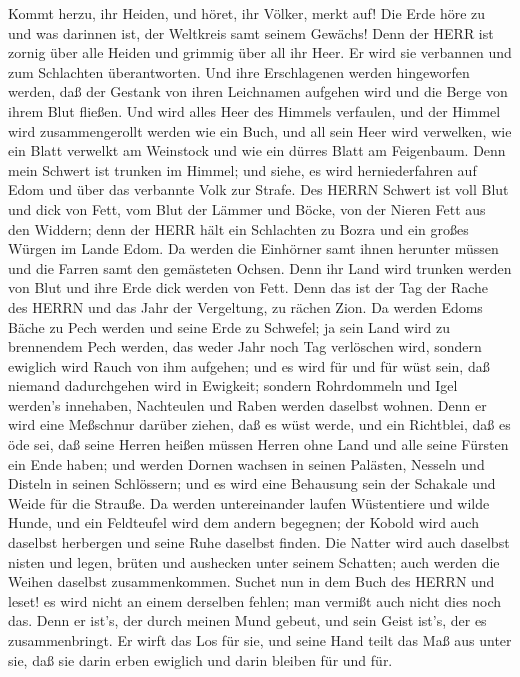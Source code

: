  Kommt herzu, ihr Heiden, und höret, ihr Völker, merkt auf!
Die Erde höre zu und was darinnen ist, der Weltkreis samt seinem
Gewächs!  Denn der HERR ist zornig über alle Heiden und
grimmig über all ihr Heer. Er wird sie verbannen und zum Schlachten
überantworten.  Und ihre Erschlagenen werden hingeworfen
werden, daß der Gestank von ihren Leichnamen aufgehen wird und die Berge
von ihrem Blut fließen.  Und wird alles Heer des Himmels
verfaulen, und der Himmel wird zusammengerollt werden wie ein Buch, und
all sein Heer wird verwelken, wie ein Blatt verwelkt am Weinstock und
wie ein dürres Blatt am Feigenbaum.  Denn mein Schwert ist
trunken im Himmel; und siehe, es wird herniederfahren auf Edom und über
das verbannte Volk zur Strafe.  Des HERRN Schwert ist voll
Blut und dick von Fett, vom Blut der Lämmer und Böcke, von der Nieren
Fett aus den Widdern; denn der HERR hält ein Schlachten zu Bozra und ein
großes Würgen im Lande Edom.  Da werden die Einhörner samt
ihnen herunter müssen und die Farren samt den gemästeten Ochsen. Denn
ihr Land wird trunken werden von Blut und ihre Erde dick werden von
Fett.  Denn das ist der Tag der Rache des HERRN und das Jahr
der Vergeltung, zu rächen Zion.  Da werden Edoms Bäche zu
Pech werden und seine Erde zu Schwefel; ja sein Land wird zu brennendem
Pech werden,  das weder Jahr noch Tag verlöschen wird,
sondern ewiglich wird Rauch von ihm aufgehen; und es wird für und für
wüst sein, daß niemand dadurchgehen wird in Ewigkeit; 
sondern Rohrdommeln und Igel werden's innehaben, Nachteulen und Raben
werden daselbst wohnen. Denn er wird eine Meßschnur darüber ziehen, daß
es wüst werde, und ein Richtblei, daß es öde sei,  daß
seine Herren heißen müssen Herren ohne Land und alle seine Fürsten ein
Ende haben;  und werden Dornen wachsen in seinen Palästen,
Nesseln und Disteln in seinen Schlössern; und es wird eine Behausung
sein der Schakale und Weide für die Strauße.  Da werden
untereinander laufen Wüstentiere und wilde Hunde, und ein Feldteufel
wird dem andern begegnen; der Kobold wird auch daselbst herbergen und
seine Ruhe daselbst finden.  Die Natter wird auch daselbst
nisten und legen, brüten und aushecken unter seinem Schatten; auch
werden die Weihen daselbst zusammenkommen.  Suchet nun in
dem Buch des HERRN und leset! es wird nicht an einem derselben fehlen;
man vermißt auch nicht dies noch das. Denn er ist's, der durch meinen
Mund gebeut, und sein Geist ist's, der es zusammenbringt. 
Er wirft das Los für sie, und seine Hand teilt das Maß aus unter sie,
daß sie darin erben ewiglich und darin bleiben für und für.

